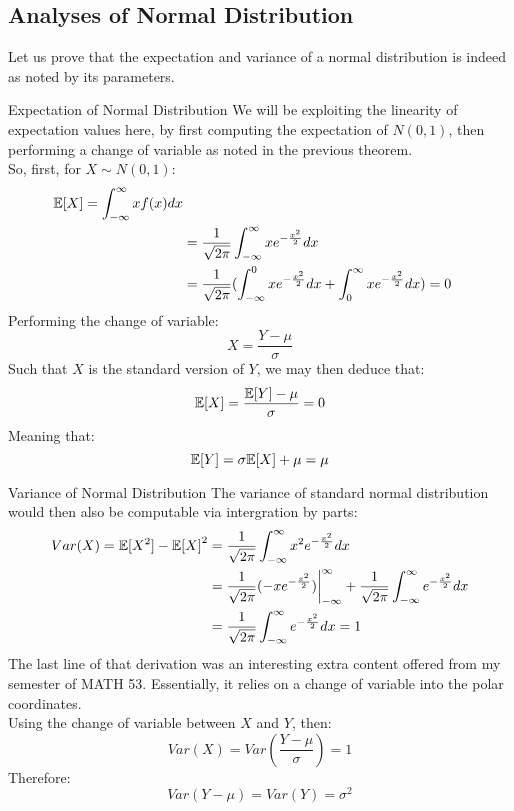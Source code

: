\subsection{Analyses of Normal Distribution}
Let us prove that the expectation and variance of a normal distribution is indeed as noted by its parameters.
\begin{ln-theorem}{Expectation of Normal Distribution}{}
    We will be exploiting the linearity of expectation values here, by first computing the expectation of $N(0, 1)$, then performing a change of variable as noted in the previous theorem. \\
    So, first, for $X \sim N(0, 1)$:
    \begin{align*}
        \mathbb{E}[X] = \int_{-\infty}^{\infty} x f(x) dx \\
        &= \frac{1}{\sqrt{2\pi}} \int_{-\infty}^{\infty} x e^{-\frac{x^2}{2}} dx \\
        &= \frac{1}{\sqrt{2\pi}} (\int_{-\infty}^{0} x e^{-\frac{x^2}{2}} dx + \int_{0}^{\infty} x e^{-\frac{x^2}{2}} dx) = 0
    \end{align*}
    Performing the change of variable:
    \[X = \frac{Y - \mu}{\sigma}\]
    Such that $X$ is the standard version of $Y$, we may then deduce that:
    \[
        \mathbb{E}[X] = \frac{\mathbb{E}[Y] - \mu}{\sigma} = 0
    \]
    Meaning that:
    \[\mathbb{E}[Y] = \sigma\mathbb{E}[X] + \mu = \mu\]
\end{ln-theorem}

\begin{ln-theorem}{Variance of Normal Distribution}{}
    The variance of standard normal distribution would then also be computable via intergration by parts:
    \begin{align*}
        Var(X) = \mathbb{E}[X^2] - {\mathbb{E}[X]}^2 &= \frac{1}{\sqrt{2\pi}} \int_{-\infty}^{\infty} x^2 e^{-\frac{x^2}{2}} dx \\
        &= \frac{1}{\sqrt{2\pi}} (-x e^{-\frac{x^2}{2}}) {\bigg|}_{-\infty}^{\infty} + \frac{1}{\sqrt{2\pi}} \int_{-\infty}^{\infty} e^{-\frac{x^2}{2}} dx \\
        &= \frac{1}{\sqrt{2\pi}} \int_{-\infty}^{\infty} e^{-\frac{x^2}{2}} dx = 1
    \end{align*}
    The last line of that derivation was an interesting extra content offered from my semester of MATH 53. Essentially, it relies on a change of variable into the polar coordinates. \\
    Using the change of variable between $X$ and $Y$, then:
    \[
        Var(X) = Var(\frac{Y - \mu}{\sigma}) = 1
    \]
    Therefore:
    \[
        Var(Y - \mu) = Var(Y) = \sigma^2
    \]
\end{ln-theorem}

